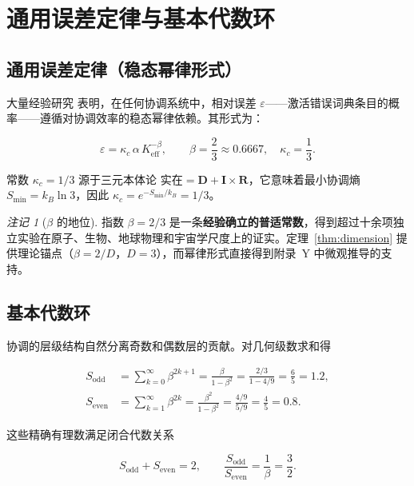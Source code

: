 \documentclass[12pt,a4paper]{article}
\theoremstyle{remark}
\newtheorem{remark}[theorem]{注记}
\begin{document}
	\section{通用误差定律与基本代数环}
	\label{sec:error-law}
	
	\subsection{通用误差定律（稳态幂律形式）}
	
	大量经验研究 \cite{AppendixL, AppendixFerra} 表明，在任何协调系统中，相对误差 \(\varepsilon\)——激活错误词典条目的概率——遵循对协调效率的稳态幂律依赖。其形式为：
	
	\begin{equation}
		\boxed{\varepsilon = \kappa_c \, \alpha \, K_{\mathrm{eff}}^{-\beta}, \qquad
			\beta = \frac{2}{3} \approx 0.6667,\quad \kappa_c = \frac{1}{3}}.
		\label{eq:error-law-corrected}
	\end{equation}
	
	常数 \(\kappa_c = 1/3\) 源于三元本体论 \(\text{实在} = \mathbf{D} + \mathbf{I} \times \mathbf{R}\)，它意味着最小协调熵 \(S_{\min} = k_B \ln 3\)，因此 \(\kappa_c = e^{-S_{\min}/k_B} = 1/3\)。
	
	\begin{remark}[\(\beta\) 的地位]
		指数 \(\beta = 2/3\) 是一条\textbf{经验确立的普适常数}，得到超过十余项独立实验在原子、生物、地球物理和宇宙学尺度上的证实。定理~\ref{thm:dimension} 提供理论锚点（\(\beta = 2/D\)，\(D=3\)），而幂律形式直接得到附录~Y 中微观推导的支持。
	\end{remark}
	
	\subsection{基本代数环}
	\label{sec:algebraic-loop}
	
	协调的层级结构自然分离奇数和偶数层的贡献。对几何级数求和得
	
	\begin{align}
		S_{\mathrm{odd}} &= \sum_{k=0}^{\infty} \beta^{2k+1} = \frac{\beta}{1-\beta^{2}}
		= \frac{2/3}{1 - 4/9} = \frac{6}{5} = 1.2, \label{eq:sodd}\\
		S_{\mathrm{even}} &= \sum_{k=1}^{\infty} \beta^{2k} = \frac{\beta^{2}}{1-\beta^{2}}
		= \frac{4/9}{5/9} = \frac{4}{5} = 0.8. \label{eq:seven}
	\end{align}
	
	这些精确有理数满足闭合代数关系
	
	\begin{equation}
		\boxed{S_{\mathrm{odd}} + S_{\mathrm{even}} = 2, \qquad
			\frac{S_{\mathrm{odd}}}{S_{\mathrm{even}}} = \frac{1}{\beta} = \frac{3}{2}}.
		\label{eq:algebraic-loop}
	\end{equation}
	
\end{document}
